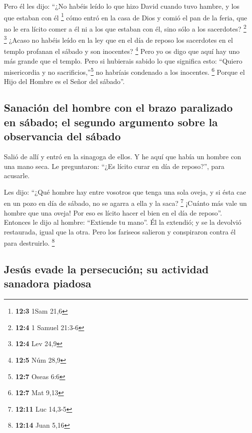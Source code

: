  Pero él les dijo: ``¿No habéis leído lo que hizo David
cuando tuvo hambre, y los que estaban con él \footnote{\textbf{12:3}
  1Sam 21,6}  cómo entró en la casa de Dios y comió el pan
de la feria, que no le era lícito comer a él ni a los que estaban con
él, sino sólo a los sacerdotes? \footnote{\textbf{12:4} 1 Samuel 21:3-6}
\footnote{\textbf{12:4} Lev 24,9}  ¿Acaso no habéis leído
en la ley que en el día de reposo los sacerdotes en el templo profanan
el sábado y son inocentes? \footnote{\textbf{12:5} Núm 28,9}
 Pero yo os digo que aquí hay uno más grande que el
templo.  Pero si hubierais sabido lo que significa esto:
``Quiero misericordia y no sacrificios,''\footnote{\textbf{12:7} Oseas
  6:6} no habríais condenado a los inocentes. \footnote{\textbf{12:7}
  Mat 9,13}  Porque el Hijo del Hombre es el Señor del
sábado''.

\hypertarget{sanaciuxf3n-del-hombre-con-el-brazo-paralizado-en-suxe1bado-el-segundo-argumento-sobre-la-observancia-del-suxe1bado}{%
\subsection{Sanación del hombre con el brazo paralizado en sábado; el
segundo argumento sobre la observancia del
sábado}\label{sanaciuxf3n-del-hombre-con-el-brazo-paralizado-en-suxe1bado-el-segundo-argumento-sobre-la-observancia-del-suxe1bado}}

 Salió de allí y entró en la sinagoga de ellos.
 Y he aquí que había un hombre con una mano seca. Le
preguntaron: ``¿Es lícito curar en día de reposo?'', para acusarle.

 Les dijo: ``¿Qué hombre hay entre vosotros que tenga una
sola oveja, y si ésta cae en un pozo en día de sábado, no se agarra a
ella y la saca? \footnote{\textbf{12:11} Luc 14,3-5} 
¡Cuánto más vale un hombre que una oveja! Por eso es lícito hacer el
bien en el día de reposo''.  Entonces le dijo al hombre:
``Extiende tu mano''. Él la extendió; y se la devolvió restaurada, igual
que la otra.  Pero los fariseos salieron y conspiraron
contra él para destruirlo. \footnote{\textbf{12:14} Juan 5,16}

\hypertarget{jesuxfas-evade-la-persecuciuxf3n-su-actividad-sanadora-piadosa}{%
\subsection{Jesús evade la persecución; su actividad sanadora
piadosa}\label{jesuxfas-evade-la-persecuciuxf3n-su-actividad-sanadora-piadosa}}

